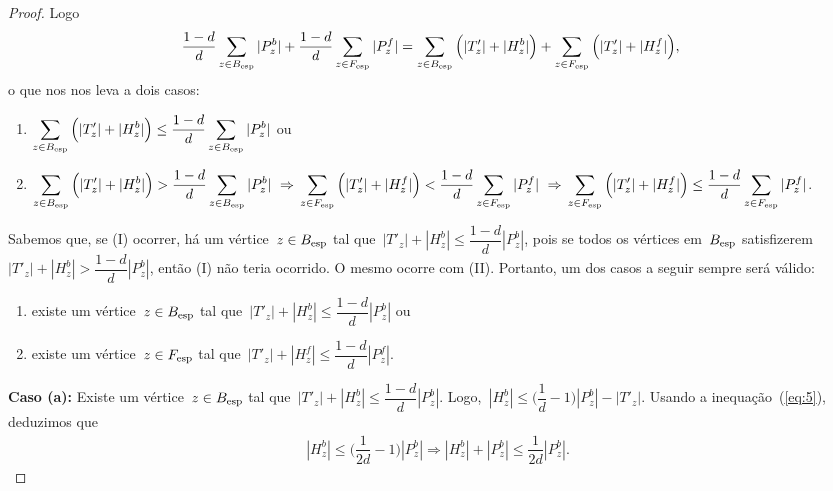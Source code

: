 \begin{proof}
			Logo
	\begin{align}
			\dfrac{1-d}{d}\displaystyle\sum_{z\in B_{\mathrm{esp}}}|P_z^b| &+ 
			\dfrac{1-d}{d}\displaystyle\sum_{z\in F_{\mathrm{esp}}}|P_z^f|
			= \displaystyle\sum_{z\in B_{\mathrm{esp}}}
			\Big(|T'_{z}|+|H_z^b|\Big) + 
			\displaystyle\sum_{z\in F_{\mathrm{esp}}}
			\Big(|T'_{z}|+|H_z^f|\Big),\nonumber
	\end{align}
	o que nos nos leva a dois casos:
	\begin{enumerate}[label=(\Roman*)]   %
		\item $\displaystyle\sum_{z\in B_{\mathrm{esp}}}
			\Big(|T'_{z}|+|H_z^b|\Big)\le
			\dfrac{1-d}{d}\displaystyle\sum_{z\in B_{\mathrm{esp}}}|P_z^b|$
			ou
		\item $\displaystyle\sum_{z\in B_{\mathrm{esp}}}
			\Big(|T'_{z}|+|H_z^b|\Big)>
			\dfrac{1-d}{d}\displaystyle\sum_{z\in B_{\mathrm{esp}}}|P_z^b|
			\ \Rightarrow \\
			\displaystyle\sum_{z\in F_{\mathrm{esp}}}
			\Big(|T'_{z}|+|H_z^f|\Big)<
			\dfrac{1-d}{d}\displaystyle\sum_{z\in F_{\mathrm{esp}}}|P_z^f|
			\ \Rightarrow \\
			\displaystyle\sum_{z\in F_{\mathrm{esp}}}
			\Big(|T'_{z}|+|H_z^f|\Big)\le
			\dfrac{1-d}{d}\displaystyle\sum_{z\in F_{\mathrm{esp}}}|P_z^f|$.
	\end{enumerate}

	Sabemos que, se (I) ocorrer, há um 
	vértice~${z\in B_{\mathrm{esp}}}$ tal que~${|T'_z|+|H^b_z|\le \dfrac{1-d}{d}|P^b_z|}$,
	pois se todos os vértices em~$B_{\mathrm{esp}}$ 
	satisfizerem~${|T'_z|+|H^b_z| > \dfrac{1-d}{d}|P^b_z|}$, então (I)
	não teria ocorrido.
	O mesmo ocorre com (II). 
	Portanto, um dos casos a seguir sempre será válido:

	\begin{enumerate}[label=(\alph*)]
		\item existe um vértice~$z\in B_{\mathrm{esp}}$ 
			tal que~$|T'_{z}|+|H_z^b|\le
			\dfrac{1-d}{d}|P_z^b|$ ou
		\item existe um vértice~$z\in F_{\mathrm{esp}}$ 
			tal que~$|T'_{z}|+|H_z^f|\le
			\dfrac{1-d}{d}|P_z^f|.$
	\end{enumerate}

	\bigskip
	\bigskip
	
	\textbf{Caso (a):}
		Existe um vértice~$z\in B_{\mathrm{esp}}$ 
		tal que~${|T'_{z}|+|H_z^b|\le
		\dfrac{1-d}{d}|P_z^b|}$. 
		Logo,~${|H^b_z|\le \Big(\dfrac{1}{d}-1\Big)|P^b_z|-|T'_z|}$.
		Usando a inequação~(\ref{eq:5}), deduzimos
		que
		\begin{align}
			|H^b_z|\le\Big(\dfrac{1}{2d}-1\Big)|P^b_z|
			\Rightarrow
			|H^b_z|+|P^b_z|\le\dfrac{1}{2d}|P^b_z|. \nonumber
		\end{align}


\end{proof}
